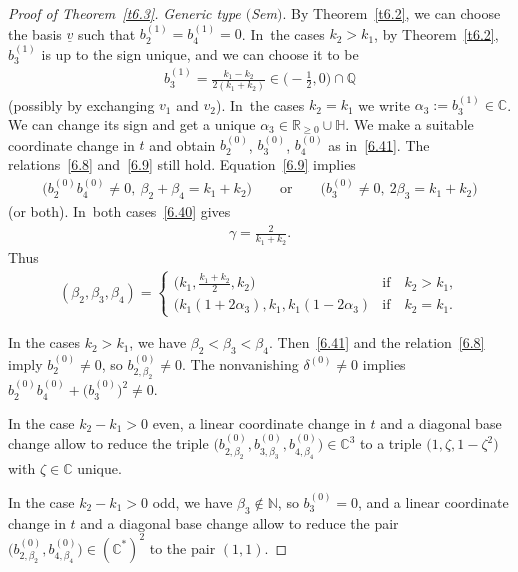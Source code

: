 \documentclass[10pt,a4paper]{amsart}
\numberwithin{equation}{section}
\numberwithin{figure}{section}
\newcommand{\N}{{\mathbb N}}
\newcommand{\Q}{{\mathbb Q}}
\newcommand{\C}{{\mathbb C}}
\newcommand{\R}{{\mathbb R}}
\renewcommand{\H}{{\mathbb H}}
\newcommand{\uuuu}{\underline}
\begin{document}
\begin{proof}[Proof of Theorem~\ref{t6.3}]
\medskip\noindent
{\it Generic type $($Sem$)$}.
By Theorem~\ref{t6.2}, we can choose the basis $\uuuu{v}$
such that $b_2^{(1)}=b_4^{(1)}=0$. In~the cases $k_2>k_1$, by Theorem~\ref{t6.2},
$b_3^{(1)}$ is up to the sign unique, and we can choose it
to be
\begin{gather*}
b_3^{(1)}=\frac{k_1-k_2}{2(k_1+k_2)}\in\bigg({-}\frac{1}{2},0\bigg)\cap\Q
\end{gather*}
(possibly by exchanging $v_1$ and $v_2$). In~the cases $k_2=k_1$
we write $\alpha_3:=b_3^{(1)}\in\C$.
We can change its sign and get a unique
$\alpha_3\in\R_{\geq 0}\cup\H$.
We make a suitable coordinate change in $t$ and obtain
$b_2^{(0)}$, $b_3^{(0)}$, $b_4^{(0)}$ as in~\eqref{6.41}.
The relations~\eqref{6.8} and~\eqref{6.9} still hold.
Equation~\eqref{6.9} implies
\begin{gather*}
\big(b_2^{(0)}b_4^{(0)}\neq 0,\ \beta_2+\beta_4=k_1+k_2\big)
\qquad\text{or}\qquad
\big(b_3^{(0)}\neq 0,\ 2\beta_3=k_1+k_2\big)
\end{gather*}
(or both). In~both cases~\eqref{6.40} gives
\begin{gather*}%
\gamma=\frac{2}{k_1+k_2}.
\end{gather*}
Thus
\begin{gather}\label{6.43}
(\beta_2,\beta_3,\beta_4)=
\begin{cases}
\big(k_1,\frac{k_1+k_2}{2},k_2\big)&\text{if}\quad k_2>k_1,
\\
(k_1(1+2\alpha_3),k_1,k_1(1-2\alpha_3)&\text{if}\quad k_2=k_1.\end{cases}
\end{gather}

In the cases $k_2>k_1$, we have $\beta_2<\beta_3<\beta_4$.
Then~\eqref{6.41} and the relation~\eqref{6.8} imply
$b_2^{(0)}\neq 0$, so $b_{2,\beta_2}^{(0)}\neq 0$.
The nonvanishing $\delta^{(0)}\neq 0 $ implies
$b_{2}^{(0)}b_{4}^{(0)}+\big(b_{3}^{(0)}\big)^2
\neq 0$.

In the case $k_2-k_1>0$ even, a linear coordinate change in $t$
and a diagonal base change allow to reduce the triple
$\big(b_{2,\beta_2}^{(0)},b_{3,\beta_3}^{(0)},b_{4,\beta_4}^{(0)}\big)
\in\C^3$ to a triple $\big(1,\zeta,1-\zeta^2\big)$
with $\zeta\in\C$ unique.

In the case $k_2-k_1>0$ odd, we have $\beta_3\notin\N$,
so $b_3^{(0)}=0$,
and a linear coordinate change in $t$ and a diagonal base
change allow to reduce the pair
$\big(b_{2,\beta_2}^{(0)},b_{4,\beta_4}^{(0)}\big)
\in(\C^*)^2$ to the pair $(1,1)$.


\end{proof}
\end{document}
